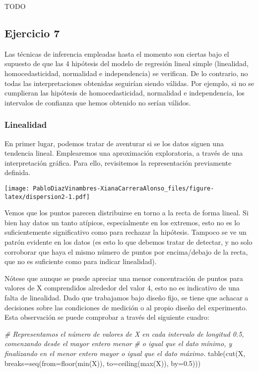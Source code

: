 \documentclass[
]{article}
\newenvironment{Shaded}{\begin{snugshade}}{\end{snugshade}}
\newcommand{\AttributeTok}[1]{\textcolor[rgb]{0.77,0.63,0.00}{#1}}
\newcommand{\CommentTok}[1]{\textcolor[rgb]{0.56,0.35,0.01}{\textit{#1}}}
\newcommand{\FloatTok}[1]{\textcolor[rgb]{0.00,0.00,0.81}{#1}}
\newcommand{\FunctionTok}[1]{\textcolor[rgb]{0.00,0.00,0.00}{#1}}
\newcommand{\NormalTok}[1]{#1}
\begin{document}
TODO

\hypertarget{ejercicio-7}{%
\subsection{Ejercicio 7}\label{ejercicio-7}}

Las técnicas de inferencia empleadas hasta el momento son ciertas bajo
el supuesto de que las 4 hipótesis del modelo de regresión lineal simple
(linealidad, homocedasticidad, normalidad e independencia) se verifican.
De lo contrario, no todas las interpretaciones obtenidas seguirían
siendo válidas. Por ejemplo, si no se cumplieran las hipótesis de
homocedasticidad, normalidad e independencia, los intervalos de
confianza que hemos obtenido no serían válidos.

\hypertarget{linealidad}{%
\subsubsection{Linealidad}\label{linealidad}}

En primer lugar, podemos tratar de aventurar si se los datos siguen una
tendencia lineal. Emplearemos una aproximación exploratoria, a través de
una interpretación gráfica. Para ello, revisitemos la representación
previamente definida.

\texttt{[image: PabloDiazVinambres-XianaCarreraAlonso\_files/figure-latex/dispersion2-1.pdf]}

Vemos que los puntos parecen distribuirse en torno a la recta de forma
lineal. Si bien hay datos un tanto atípicos, especialmente en los
extremos, esto no es lo suficientemente significativo como para rechazar
la hipótesis. Tampoco se ve un patrón evidente en los datos (es esto lo
que debemos tratar de detectar, y no solo corroborar que haya el mismo
número de puntos por encima/debajo de la recta, que no es suficiente
como para indicar linealidad).

Nótese que aunque se puede apreciar una menor concentración de puntos
para valores de X comprendidos alrededor del valor 4, esto no es
indicativo de una falta de linealidad. Dado que trabajamos bajo diseño
fijo, se tiene que achacar a decisiones sobre las condiciones de
medición o al propio diseño del experimento. Esta observación se puede
comprobar a través del siguiente cuadro:

\begin{Shaded}
\begin{Highlighting}[]
\CommentTok{\# Representamos el número de valores de X en cada intervalo de longitud 0.5, comenzando desde el mayor entero menor}
\CommentTok{\# o igual que el dato mínimo, y finalizando en el menor entero mayor o igual que el dato máximo.}
\FunctionTok{table}\NormalTok{(}\FunctionTok{cut}\NormalTok{(X, }\AttributeTok{breaks=}\FunctionTok{seq}\NormalTok{(}\AttributeTok{from=}\FunctionTok{floor}\NormalTok{(}\FunctionTok{min}\NormalTok{(X)), }\AttributeTok{to=}\FunctionTok{ceiling}\NormalTok{(}\FunctionTok{max}\NormalTok{(X)), }\AttributeTok{by=}\FloatTok{0.5}\NormalTok{)))}
\end{Highlighting}
\end{Shaded}
\end{document}
